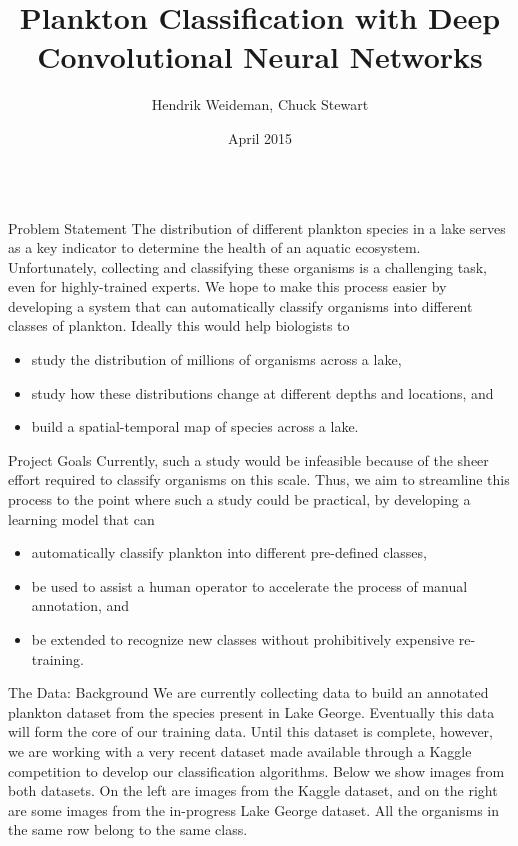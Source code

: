 \documentclass[final,hyperref={pdfpagelabels=false}]{beamer}
\title{\huge Plankton Classification with Deep Convolutional Neural Networks}
\author{Hendrik Weideman, Chuck Stewart}
\institute{Department of Computer Science\\Rensselaer Polytechnic Institute}
\date[April 2015]{April 2015}
\begin{document}
\begin{frame}
  \begin{columns}[T]
  	\begin{column}{.32\textwidth}
      \begin{block}{Problem Statement}
        The distribution of different plankton species in a lake serves as a key indicator to determine the health of an aquatic
        ecosystem.  Unfortunately, collecting and classifying these organisms is a challenging task, even for highly-trained
        experts.
        We hope to make this process easier by developing a system that can automatically classify organisms into different classes of
        plankton.  Ideally this would help biologists to
        \begin{itemize}
          \item study the distribution of millions of organisms across a lake,
          \item study how these distributions change at different depths and locations, and
          \item build a spatial-temporal map of species across a lake.
        \end{itemize}
      \end{block}

      \begin{block}{Project Goals}
        Currently, such a study would be infeasible because of the sheer effort required to classify organisms on this scale.
        Thus, we aim to streamline this process to the point where such a study could be practical, by developing a learning model
        that can
        \begin{itemize}
          \item automatically classify plankton into different pre-defined classes,
          \item be used to assist a human operator to accelerate the process of manual annotation, and
          \item be extended to recognize new classes without prohibitively expensive re-training.
        \end{itemize}
      \end{block}

      \begin{block}{The Data: Background}
        We are currently collecting data to build an annotated plankton dataset from the species present in Lake George. 
        Eventually this data
        will form the core of our training data.  Until this dataset is complete, however, we are working with a very recent dataset
        made available through a Kaggle competition to develop our classification algorithms.  Below we show images from both datasets.
        On the left are images from the Kaggle dataset, and on the right are some images from the in-progress Lake George dataset.
        All the organisms in the same row belong to the same class.


\end{block}
\end{column}
\end{columns}
\end{frame}
\end{document}
